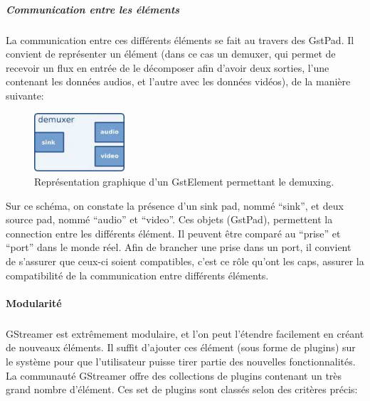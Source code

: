 \subparagraph{Communication entre les éléments}

\subparagraph{}

La communication entre ces différents éléments se fait au travers des
GstPad. Il convient de représenter un élément (dans ce cas un demuxer,
qui permet de recevoir un flux en entrée de le décomposer afin d'avoir
deux sorties, l'une contenant les données audios, et l'autre avec les
données vidéos), de la manière suivante:

\begin{figure} [H]

  \begin{center}

    \includegraphics[width=0.30\textwidth]{images/gstdemuxer}

  \end{center}

  \caption{Représentation graphique d'un GstElement permettant le
  demuxing.}

  \label{Yes}

\end{figure}

Sur ce schéma, on constate la présence d'un sink pad, nommé ``sink'',
et deux source pad, nommé ``audio'' et ``video''. Ces objets (GstPad),
permettent la connection entre les différents élément. Il peuvent être
comparé au ``prise'' et ``port'' dans le monde réel.  Afin de brancher
une prise dans un port, il convient de s'assurer que ceux-ci soient
compatibles, c'est ce rôle qu'ont les caps, assurer la compatibilité
de la communication entre différents éléments.

\paragraph {Modularité}

\subparagraph{}

GStreamer est extrêmement modulaire, et l'on peut l'étendre facilement
en créant de nouveaux éléments. Il suffit d'ajouter ces élément
(sous forme de plugins) sur le système pour que l'utilisateur puisse
tirer partie des nouvelles fonctionnalités. La communauté GStreamer
offre des collections de plugins contenant un très grand nombre
d'élément. Ces set de plugins sont classés selon des critères précis:

